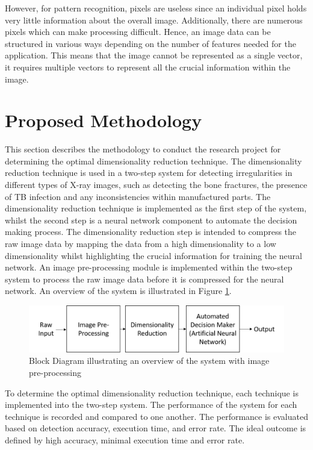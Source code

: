 \documentclass[11pt]{article}
\begin{document}
	However, for pattern recognition, pixels are useless since an individual pixel holds very little information about the overall image. Additionally, there are numerous pixels which can make processing difficult. Hence, an image data can be structured in various ways depending on the number of features needed for the application. This means that the image cannot be represented as a single vector, it requires multiple vectors to represent all the crucial information within the image.
	
	\section{Proposed Methodology}
	\label{sc: Proposed Methodology}
	This section describes the methodology to conduct the research project for determining the optimal dimensionality reduction technique. The dimensionality reduction technique is used in a two-step system for detecting irregularities in different types of X-ray images, such as detecting the bone fractures, the presence of TB infection and any inconsistencies within manufactured parts. The dimensionality reduction technique is implemented as the first step of the system, whilst the second step is a neural network component to automate the decision making process. The dimensionality reduction step is intended to compress the raw image data by mapping the data from a high dimensionality to a low dimensionality whilst highlighting the crucial information for training the neural network. An image pre-processing module is implemented within the two-step system to process the raw image data before it is compressed for the neural network. An overview of the system is illustrated in Figure \ref{fig:system overview}.
	
	\begin{figure}[!h]
		\centering
		\includegraphics[scale=0.43]{system_overview_2.png}
		\caption{Block Diagram illustrating an overview of the system with image pre-processing }
		\label{fig:system overview}
	\end{figure}
	
	To determine the optimal dimensionality reduction technique, each technique is implemented into the two-step system. The performance of the system for each technique is recorded and compared to one another. The performance is evaluated based on detection accuracy, execution time, and error rate. The ideal outcome is defined by high accuracy, minimal execution time and error rate.
	
\end{document}
